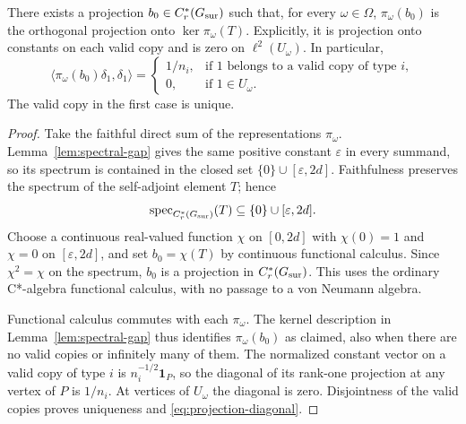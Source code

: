 \begin{proposition}
\label{prop:projection}
There exists a projection $b_0\in C_r^*(G_{\mathrm{sur}})$ such that, for every
$\omega\in\Omega$, $\pi_\omega(b_0)$ is the orthogonal projection
onto $\ker\pi_\omega(T)$.  Explicitly, it is projection onto constants
on each valid copy and is zero on $\ell^2(U_\omega)$.  In particular,
\begin{equation}
 \langle\pi_\omega(b_0)\delta_1,\delta_1\rangle
 =
 \begin{cases}
  1/n_i,&\text{if $1$ belongs to a valid copy of type $i$},\\
  0,&\text{if $1\in U_\omega$}.
 \end{cases}
 \label{eq:projection-diagonal}
\end{equation}
The valid copy in the first case is unique.
\end{proposition}

\begin{proof}
Take the faithful direct sum of the representations
$\pi_\omega$.  Lemma~\ref{lem:spectral-gap} gives the same positive
constant $\varepsilon$ in every summand, so its spectrum is contained
in the closed set $\{0\}\cup[\varepsilon,2d]$.  Faithfulness preserves
the spectrum of the self-adjoint element $T$; hence
\[
 \operatorname{spec}_{C_r^*(G_{\mathrm{sur}})}(T)\subseteq\{0\}\cup[\varepsilon,2d].
\]
Choose a continuous real-valued function $\chi$ on $[0,2d]$ with
$\chi(0)=1$ and $\chi=0$ on $[\varepsilon,2d]$, and set
$b_0=\chi(T)$ by continuous functional calculus.  Since $\chi^2=\chi$
on the spectrum, $b_0$ is a projection in $C_r^*(G_{\mathrm{sur}})$.  This uses the
ordinary C*-algebra functional calculus, with no passage to a von
Neumann algebra.

Functional calculus commutes with each $\pi_\omega$.  The kernel
description in Lemma~\ref{lem:spectral-gap} thus identifies
$\pi_\omega(b_0)$ as claimed, also when there are no valid copies or
infinitely many of them.  The normalized constant vector on a valid
copy of type $i$ is $n_i^{-1/2}\mathbf 1_P$, so the diagonal of its
rank-one projection at any vertex of $P$ is $1/n_i$.  At vertices of
$U_\omega$ the diagonal is zero.  Disjointness of the valid copies
proves uniqueness and \eqref{eq:projection-diagonal}.
\end{proof}
